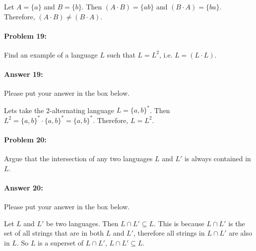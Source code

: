 \documentclass[10pt]{article}
\newenvironment{AnswerBox}{\begin{mdframed}[style=simple]}{\end{mdframed}}
\begin{document}
\begin{AnswerBox}%

  Let $A = \{a\}$ and $B = \{b\}$. Then $(A\cdot B) = \{ab\}$ and $(B\cdot A) = \{ba\}$. Therefore, $(A\cdot B) \neq (B\cdot A)$.

\end{AnswerBox}%

\noindent\hrulefill %

\paragraph{Problem 19:}
Find an example of a language $L$ such that $L=L^2$, i.e. $L=(L\cdot L)$.

\paragraph{Answer 19:} Please put your answer in the box below.

\begin{AnswerBox}%

  Lets take the 2-alternating language $L = \{a, b\}^*$. Then $L^2 = \{a, b\}^* \cdot \{a, b\}^* = \{a, b\}^*$. Therefore, $L = L^2$.

\end{AnswerBox}%

\noindent\hrulefill %

\paragraph{Problem 20:}
Argue that the intersection of any two languages $L$ and $L'$ is always
contained in $L$.

\paragraph{Answer 20:} Please put your answer in the box below.

\begin{AnswerBox}%

  Let $L$ and $L'$ be two languages. Then $L \cap L' \subseteq L$. This is because $L \cap L'$ is the set of all strings that are in both $L$ and $L'$, therefore all strings in $L \cap L'$ are also in $L$. So $L$ is a superset of $L \cap L'$, $L \cap L' \subseteq L$.

\end{AnswerBox}%
\end{document}
